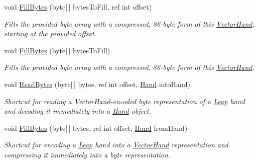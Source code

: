 \begin{DoxyCompactItemize}
void \mbox{\hyperlink{class_leap_1_1_unity_1_1_encoding_1_1_vector_hand_a05ef96613b46f48f93ac66fe23294b23}{Fill\+Bytes}} (byte\mbox{[}$\,$\mbox{]} bytes\+To\+Fill, ref int offset)
\begin{DoxyCompactList}\small\item\em Fills the provided byte array with a compressed, 86-\/byte form of this \mbox{\hyperlink{class_leap_1_1_unity_1_1_encoding_1_1_vector_hand}{Vector\+Hand}}, starting at the provided offset. \end{DoxyCompactList}\item 
void \mbox{\hyperlink{class_leap_1_1_unity_1_1_encoding_1_1_vector_hand_af5ad73d71bf71937153af3c6049ead52}{Fill\+Bytes}} (byte\mbox{[}$\,$\mbox{]} bytes\+To\+Fill)
\begin{DoxyCompactList}\small\item\em Fills the provided byte array with a compressed, 86-\/byte form of this \mbox{\hyperlink{class_leap_1_1_unity_1_1_encoding_1_1_vector_hand}{Vector\+Hand}}. \end{DoxyCompactList}\item 
void \mbox{\hyperlink{class_leap_1_1_unity_1_1_encoding_1_1_vector_hand_a933acd17a4ff101050a616f294e2c46c}{Read\+Bytes}} (byte\mbox{[}$\,$\mbox{]} bytes, ref int offset, \mbox{\hyperlink{class_leap_1_1_hand}{Hand}} into\+Hand)
\begin{DoxyCompactList}\small\item\em Shortcut for reading a Vector\+Hand-\/encoded byte representation of a \mbox{\hyperlink{namespace_leap_1_1_unity_1_1_leap}{Leap}} hand and decoding it immediately into a \mbox{\hyperlink{class_leap_1_1_hand}{Hand}} object. \end{DoxyCompactList}\item 
void \mbox{\hyperlink{class_leap_1_1_unity_1_1_encoding_1_1_vector_hand_a3283b0824ff4862ef5a19f188432c4d2}{Fill\+Bytes}} (byte\mbox{[}$\,$\mbox{]} bytes, ref int offset, \mbox{\hyperlink{class_leap_1_1_hand}{Hand}} from\+Hand)
\begin{DoxyCompactList}\small\item\em Shortcut for encoding a \mbox{\hyperlink{namespace_leap_1_1_unity_1_1_leap}{Leap}} hand into a \mbox{\hyperlink{class_leap_1_1_unity_1_1_encoding_1_1_vector_hand}{Vector\+Hand}} representation and compressing it immediately into a byte representation. \end{DoxyCompactList}\end{DoxyCompactItemize}
